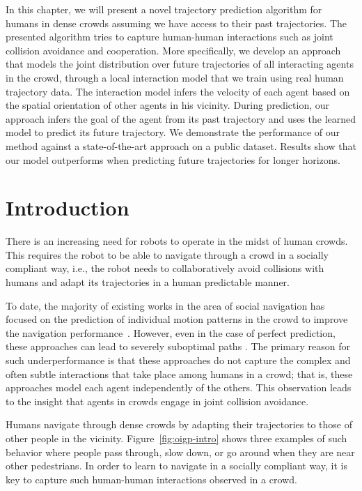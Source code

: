 In this chapter, we will present a novel trajectory prediction algorithm for humans in dense crowds assuming we have access to their past trajectories. The presented algorithm tries to capture human-human interactions such as joint collision avoidance and cooperation. More specifically, we develop an approach that models the joint distribution over future trajectories of all interacting agents in the crowd, through a local interaction model that we train using real human trajectory data. The interaction model infers the velocity of each agent based on the spatial orientation of other agents in his vicinity. During prediction, our approach infers the goal of the agent from its past trajectory and uses the learned model to predict its future trajectory. We demonstrate the performance of our method against a state-of-the-art approach on a public dataset. Results show that our model outperforms when predicting future trajectories for longer horizons.

\section{Introduction}
\label{sec:oigp-introduction}

There is an increasing need for robots to operate in the midst of
human crowds. This requires the robot to be able to navigate through a
crowd in a socially compliant way, i.e., the robot needs to
collaboratively avoid collisions with humans and adapt its
trajectories in a human predictable manner.

To date, the majority of existing works in the area of social
navigation has focused on the prediction of individual motion patterns
in the crowd to improve the navigation performance~\cite{thompson09,
  bennewitz05, large04}. However, even in the case of perfect
prediction, these approaches can lead to
severely suboptimal paths \cite{trautman10}.
The primary reason for such underperformance is that these approaches
do not capture the complex and often subtle interactions that take
place among humans in a crowd; that is, these approaches model each
agent independently of the others. This observation leads to the
insight that agents in crowds engage in joint collision avoidance.

Humans navigate through dense crowds by adapting their trajectories
to those of other people in the vicinity.
Figure~\ref{fig:oigp-intro} shows three examples of such behavior where
people pass through, slow down, or go around when they are near
other pedestrians.
In order to learn to navigate in a socially compliant way, it is key
to capture such human-human interactions observed in a crowd.

